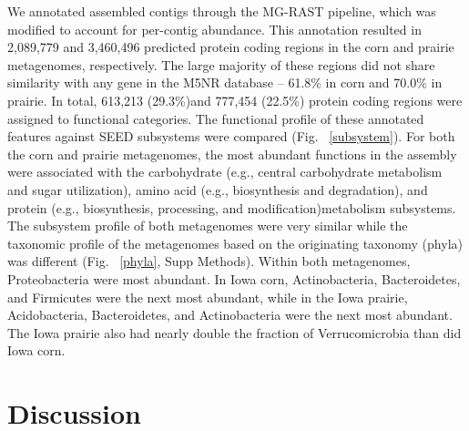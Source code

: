\documentclass{nature}%
\providecommand{\DIFdelend}{} %
\begin{document}
\DIFdelend We annotated assembled contigs through the
MG-RAST
pipeline, which was modified to account for per-contig abundance. This
annotation resulted in 2,089,779 and 3,460,496 predicted protein coding regions
in the corn and prairie metagenomes, respectively. The large majority of these
regions did not share similarity with any gene in the M5NR database -- 61.8\% in
corn and 70.0\% in prairie. In total, 613,213 (29.3\%)and 777,454 (22.5\%)
protein coding regions were assigned to functional categories. The functional
profile of these annotated features against SEED subsystems were compared (Fig.
~\ref{subsystem}). For both the corn and prairie metagenomes, the most abundant
functions in the assembly were associated with the carbohydrate (e.g., central
carbohydrate metabolism and sugar utilization), amino acid (e.g., biosynthesis
and degradation), and protein (e.g., biosynthesis, processing, and
modification)metabolism subsystems. The subsystem profile of both metagenomes
were very
similar while the taxonomic profile of the metagenomes based on the originating
taxonomy (phyla) was different (Fig. ~\ref{phyla}, Supp Methods). Within both
metagenomes, Proteobacteria were most abundant. In Iowa corn, Actinobacteria,
Bacteroidetes, and Firmicutes were the next most abundant, while in the Iowa
prairie, Acidobacteria, Bacteroidetes, and Actinobacteria were the next most
abundant. The Iowa prairie also had nearly double the fraction of
Verrucomicrobia than did Iowa corn.


\section*{Discussion}

\end{document}
